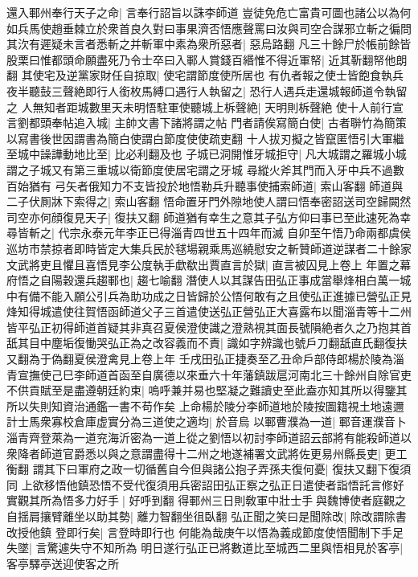 還入鄆州奉行天子之命|{
	言奉行詔旨以誅李師道}
豈徒免危亡富貴可圖也諸公以為何如兵馬使趙垂棘立於衆首良久對曰事果濟否悟應聲罵曰汝與司空合謀邪立斬之徧問其㳄有遲疑未言者悉斬之并斬軍中素為衆所惡者|{
	惡烏路翻}
凡三十餘尸於帳前餘皆股栗曰惟都頭命願盡死乃令士卒曰入鄆人賞錢百緡惟不得近軍帑|{
	近其靳翻帑他朗翻}
其使宅及逆黨家財任自掠取|{
	使宅謂節度使所居也}
有仇者報之使士皆飽食執兵夜半聽鼔三聲絶即行人銜枚馬縛口遇行人執留之|{
	恐行人遇兵走還城報師道令執留之}
人無知者距城數里天未明悟駐軍使聽城上柝聲絶|{
	天明則柝聲絶}
使十人前行宣言劉都頭奉帖追入城|{
	主帥文書下諸將謂之帖}
門者請俟寫簡白使|{
	古者聨竹為簡策以寫書後世因謂書為簡白使謂白節度使使疏吏翻}
十人拔刃擬之皆竄匿悟引大軍繼至城中譟譁動地比至|{
	比必利翻及也}
子城已洞開惟牙城拒守|{
	凡大城謂之羅城小城謂之子城又有第三重城以衛節度使居宅謂之牙城}
尋縱火斧其門而入牙中兵不過數百始猶有弓矢者俄知力不支皆投於地悟勒兵升聽事使捕索師道|{
	索山客翻}
師道與二子伏厠牀下索得之|{
	索山客翻}
悟命置牙門外隙地使人謂曰悟奉密詔送司空歸闕然司空亦何顔復見天子|{
	復扶又翻}
師道猶有幸生之意其子弘方仰曰事已至此速死為幸尋皆斬之|{
	代宗永泰元年李正已得淄青四世五十四年而滅}
自卯至午悟乃命兩都虞侯巡坊市禁掠者即時皆定大集兵民於毬場親乘馬巡繞慰安之斬贊師道逆謀者二十餘家文武將吏且懼且喜悟見李公度執手歔欷出賈直言於獄|{
	直言被囚見上卷上}
年置之幕府悟之自陽穀還兵趨鄆也|{
	趨七喻翻}
潛使人以其謀告田弘正事成當舉烽相白萬一城中有備不能入願公引兵為助功成之日皆歸於公悟何敢有之且使弘正進據已營弘正見烽知得城遣使往賀悟函師道父子三首遣使送弘正營弘正大喜露布以聞淄青等十二州皆平弘正初得師道首疑其非真召夏侯澄使識之澄熟視其面長號隕絶者久之乃抱其首舐其目中塵垢復慟哭弘正為之改容義而不責|{
	識如字辨識也號戶刀翻舐直氏翻復扶又翻為于偽翻夏侯澄禽見上卷上年}
壬戌田弘正捷奏至乙丑命戶部侍郎楊於陵為淄青宣撫使己巳李師道首函至自廣德以來垂六十年藩鎮跋扈河南北三十餘州自除官吏不供貢賦至是盡遵朝廷約束|{
	嗚呼兼并易也堅凝之難讀史至此盍亦知其所以得鑒其所以失則知資治通鑑一書不苟作矣}
上命楊於陵分李師道地於陵按圖籍視土地遠邇計士馬衆寡校倉庫虚實分為三道使之適均|{
	於音烏}
以鄆曹濮為一道|{
	鄆音運濮音卜}
淄青齊登萊為一道兖海沂密為一道上從之劉悟以初討李師道詔云部將有能殺師道以衆降者師道官爵悉以與之意謂盡得十二州之地遂補署文武將佐更易州縣長吏|{
	更工衡翻}
謂其下曰軍府之政一切循舊自今但與諸公抱子弄孫夫復何憂|{
	復扶又翻下復須同}
上欲移悟他鎮恐悟不受代復須用兵密詔田弘正察之弘正日遣使者詣悟託言修好實觀其所為悟多力好手|{
	好呼到翻}
得鄆州三日則敎軍中壯士手與魏博使者庭觀之自揺肩攘臂離坐以助其勢|{
	離力智翻坐徂臥翻}
弘正聞之笑曰是聞除改|{
	除改謂除書改授他鎮}
登即行矣|{
	言登時即行也}
何能為哉庚午以悟為義成節度使悟聞制下手足失墜|{
	言驚遽失守不知所為}
明日遂行弘正已將數道比至城西二里與悟相見於客亭|{
	客亭驛亭送迎使客之所}
